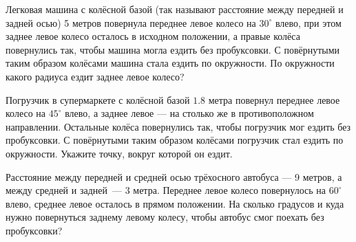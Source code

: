 ﻿
\begin{enumerate}

\itA Легковая машина с колёсной базой (так называют расстояние между передней и задней осью) 5 метров повернула переднее левое колесо на $30^\circ$ влево, при этом заднее левое колесо осталось в исходном положении, а правые колёса повернулись так, чтобы машина могла ездить без пробуксовки. С повёрнутыми таким образом колёсами машина стала ездить по окружности. По окружности какого радиуса ездит заднее левое колесо?

\itB Погрузчик в супермаркете с колёсной базой $1.8$ метра повернул переднее левое колесо на $45^\circ$ влево, а заднее левое — на столько же в противоположном направлении. Остальные колёса повернулись так, чтобы погрузчик мог ездить без пробуксовки. С повёрнутыми таким образом колёсами погрузчик стал ездить по окружности. Укажите точку, вокруг которой он ездит.

\itC Расстояние между передней и средней осью трёхосного автобуса — 9 метров, а между средней и задней~— 3 метра. Переднее левое колесо повернулось на $60^\circ$ влево, среднее левое осталось в прямом положении. На сколько градусов и куда нужно повернуться заднему левому колесу, чтобы автобус смог поехать без пробуксовки?
\end{enumerate}